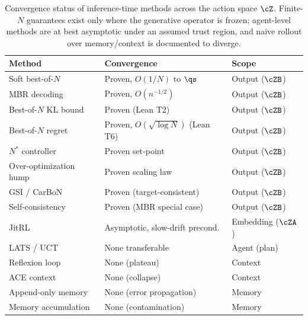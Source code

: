 \begin{table}[t]
\centering
\small
\begin{tabular}{@{}lll@{}}
\toprule
Method & Convergence & Scope \\
\midrule
Soft best-of-$N$ \citep{verdun2025softbon} & Proven, $O(1/N)$ to $\qs$ & Output ($\cZB$) \\
MBR decoding \citep{ichihara2025mbr,mbrasr2025} & Proven, $O(n^{-1/2})$ & Output ($\cZB$) \\
Best-of-$N$ KL bound \citep{beirami2024bon} & Proven (Lean T2) & Output ($\cZB$) \\
Best-of-$N$ regret \citep{aminian2025smoothing} & Proven, $O(\sqrt{\log N})$ (Lean T6) & Output ($\cZB$) \\
$N^\ast$ controller \citep{khalaf2025hedgetune} & Proven set-point & Output ($\cZB$) \\
Over-optimization hump \citep{gao2023overopt} & Proven scaling law & Output ($\cZB$) \\
GSI / CarBoN \citep{geuter2025gsi,carbon2025} & Proven (target-consistent) & Output ($\cZB$) \\
Self-consistency \citep{wang2023selfconsistency} & Proven (MBR special case) & Output ($\cZB$) \\
\midrule
JitRL \citep{jitrl2026} & Asymptotic, slow-drift precond. & Embedding ($\cZA$) \\
LATS / UCT \citep{lats2023,kocsis2006uct} & None transferable & Agent (plan) \\
\midrule
Reflexion loop \citep{reflexion2023} & None (plateau) & Context \\
ACE context \citep{ace2025} & None (collapse) & Context \\
Append-only memory \citep{expfollowing2025} & None (error propagation) & Memory \\
Memory accumulation \citep{remembering2026} & None (contamination) & Memory \\
\bottomrule
\end{tabular}
\caption{Convergence status of inference-time methods across the action space $\cZ$. Finite-$N$ guarantees exist only where the generative operator is frozen; agent-level methods are at best asymptotic under an assumed trust region, and naive rollout over memory/context is documented to diverge.}
\label{tab:convergence}
\end{table}